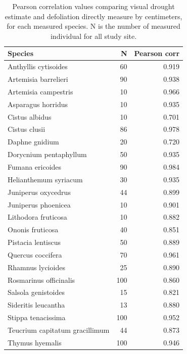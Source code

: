 \documentclass[11pt,twoside]{reedthesis}
\begin{document}
\begin{table}[H]

\caption[Pearson correlation values comparing visual drought estimates and defoliation]{\label{tab:unnamed-chunk-11}Pearson correlation values comparing visual drought estimate and defoliation directly measure by centimeters, for each measured species. N is the number of measured individual for all study site.}
\centering
\fontsize{8}{10}\selectfont
\begin{tabular}[t]{lrr}
\toprule
Species & N & Pearson corr\\
\midrule
Anthyllis cytisoides & 60 & 0.919\\
Artemisia barrelieri & 90 & 0.938\\
Artemisia campestris & 10 & 0.966\\
Asparagus horridus & 10 & 0.935\\
Cistus albidus & 10 & 0.701\\
Cistus clusii & 86 & 0.978\\
Daphne gnidium & 20 & 0.720\\
Dorycnium pentaphyllum & 50 & 0.935\\
Fumana ericoides & 90 & 0.984\\
Helianthemum syriacum & 30 & 0.935\\
Juniperus oxycedrus & 44 & 0.899\\
Juniperus phoenicea & 10 & 0.901\\
Lithodora fruticosa & 10 & 0.882\\
Ononis fruticosa & 40 & 0.851\\
Pistacia lentiscus & 50 & 0.889\\
Quercus coccifera & 70 & 0.961\\
Rhamnus lycioides & 25 & 0.890\\
Rosmarinus officinalis & 100 & 0.860\\
Salsola genistoides & 15 & 0.821\\
Sideritis leucantha & 13 & 0.880\\
Stippa tenacissima & 100 & 0.952\\
Teucrium  capitatum gracillimum & 44 & 0.873\\
Thymus hyemalis & 100 & 0.946\\
\bottomrule
\end{tabular}
\end{table}
\setlength{\abovecaptionskip}{0pt}
\end{document}
